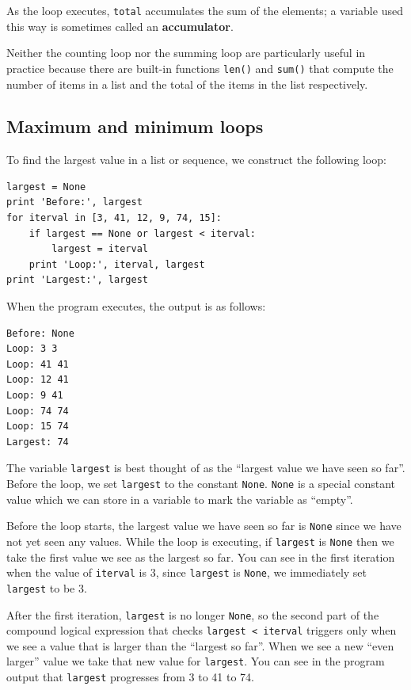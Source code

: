 \documentclass[10pt]{book}
\begin{document}
As the loop executes, {\tt total} accumulates the sum of the
elements; a variable used this way is sometimes called an
{\bf accumulator}.

Neither the counting loop nor the summing loop are particularly 
useful in practice because there are built-in functions 
{\tt len()} and {\tt sum()} that compute the number of 
items in a list and the total of the items in the list
respectively.

\subsection{Maximum and minimum loops}

To find the largest value in a list or sequence, we construct the
following loop:

\beforeverb
\begin{verbatim}
largest = None
print 'Before:', largest
for iterval in [3, 41, 12, 9, 74, 15]:
    if largest == None or largest < iterval:
        largest = iterval
    print 'Loop:', iterval, largest
print 'Largest:', largest
\end{verbatim}
\afterverb
%
When the program executes, the output is as follows:

\beforeverb
\begin{verbatim}
Before: None
Loop: 3 3
Loop: 41 41
Loop: 12 41
Loop: 9 41
Loop: 74 74
Loop: 15 74
Largest: 74
\end{verbatim}
\afterverb
%
The variable {\tt largest} is best thought of as 
the ``largest value we have seen so far''.
Before the loop, we set {\tt largest} to the constant {\tt None}.  
{\tt None} is a special constant value which we can 
store in a variable to mark 
the variable as ``empty''.  

Before the loop starts, the largest value we have seen so far 
is {\tt None} since we have not yet seen any values.  While the 
loop is executing, if {\tt largest} is {\tt None} then we take
the first value we see as the largest so far.   You can see in 
the first iteration when the value of {\tt iterval} is 3,
since {\tt largest} is {\tt None}, we immediately set 
{\tt largest} to be 3.

After the first iteration, {\tt largest} is no longer {\tt None},
so the second part of the compound logical expression that checks
{\tt largest < iterval} triggers only when we see a value that is
larger than the ``largest so far''.  When we see a new ``even larger''
value we take that new value for {\tt largest}.  You can see in the 
program output that {\tt largest} progresses from 3 to 41 to 74.
\end{document}
